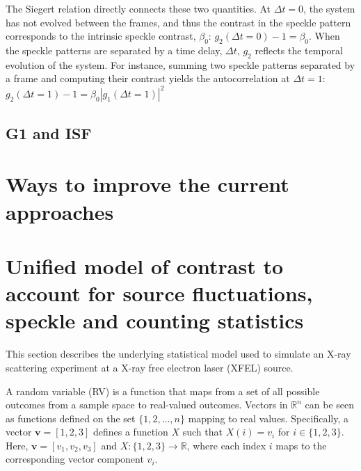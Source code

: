 \documentclass[11pt]{article}
\theoremstyle{definition}
\begin{document}
The Siegert relation directly connects these two quantities. At \(\Delta t = 0\), the system has not evolved between the frames, and thus the contrast in the speckle pattern corresponds to the intrinsic speckle contrast, \(\beta_0\): \(g_2(\Delta t = 0) - 1 = \beta_0\). 
When the speckle patterns are separated by a time delay, \(\Delta t\), \(g_2\) reflects the temporal evolution of the system. For instance, summing two speckle patterns separated by a frame and computing their contrast yields the autocorrelation at \(\Delta t = 1\): \(g_2(\Delta t = 1) - 1 = \beta_0 |g_1(\Delta t = 1)|^2\)
\subsection{G1 and ISF}

\section{Ways to improve the current approaches}

\section{Unified model of contrast to account for source fluctuations, speckle and counting statistics}
This section describes the underlying statistical model used to simulate an X-ray scattering experiment at a X-ray free electron laser (XFEL) source. 

A random variable (RV) is a function that maps from a set of all possible outcomes from a sample space to real-valued outcomes. Vectors in \(\mathbb{R}^n\) can be seen as functions defined on the set \(\{1, 2, \ldots, n\}\) mapping to real values. Specifically, a vector \(\mathbf{v} = [1, 2, 3]\) defines a function \(X\) such that \(X(i) = v_i\) for \(i \in \{1, 2, 3\}\). Here, \(\mathbf{v} = [v_1, v_2, v_3]\) and \(X: \{1, 2, 3\} \rightarrow \mathbb{R}\), where each index \(i\) maps to the corresponding vector component \(v_i\).
\end{document}
